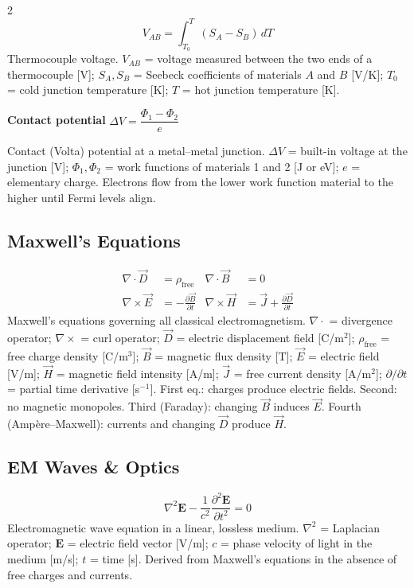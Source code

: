 \documentclass[9pt]{extarticle}
\newcommand{\eqlabel}[1]{\textbf{\scriptsize #1}\;}
\newcommand{\desc}[1]{{\small\color{desc}#1}}
\begin{document}
\begin{multicols}{2}
\[V_{AB} = \int_{T_0}^{T}(S_A - S_B)\,dT\]
\desc{Thermocouple voltage. $V_{AB}$ = voltage measured between the two ends of a thermocouple [V]; $S_A, S_B$ = Seebeck coefficients of materials $A$ and $B$ [V/K]; $T_0$ = cold junction temperature [K]; $T$ = hot junction temperature [K].}

\eqlabel{Contact potential} $\Delta V = \dfrac{\Phi_1 - \Phi_2}{e}$

\desc{Contact (Volta) potential at a metal--metal junction. $\Delta V$ = built-in voltage at the junction [V]; $\Phi_1, \Phi_2$ = work functions of materials 1 and 2 [J or eV]; $e$ = elementary charge. Electrons flow from the lower work function material to the higher until Fermi levels align.}

\subsection{Maxwell's Equations}
\begin{align*}
\nabla\cdot\vec{D} &= \rho_{\text{free}} & \nabla\cdot\vec{B} &= 0 \\
\nabla\times\vec{E} &= -\frac{\partial\vec{B}}{\partial t} & \nabla\times\vec{H} &= \vec{J} + \frac{\partial\vec{D}}{\partial t}
\end{align*}
\desc{Maxwell's equations governing all classical electromagnetism. $\nabla\cdot$ = divergence operator; $\nabla\times$ = curl operator; $\vec{D}$ = electric displacement field [C/m$^2$]; $\rho_{\text{free}}$ = free charge density [C/m$^3$]; $\vec{B}$ = magnetic flux density [T]; $\vec{E}$ = electric field [V/m]; $\vec{H}$ = magnetic field intensity [A/m]; $\vec{J}$ = free current density [A/m$^2$]; $\partial/\partial t$ = partial time derivative [s$^{-1}$]. First eq.: charges produce electric fields. Second: no magnetic monopoles. Third (Faraday): changing $\vec{B}$ induces $\vec{E}$. Fourth (Amp\`ere--Maxwell): currents and changing $\vec{D}$ produce $\vec{H}$.}

\subsection{EM Waves \& Optics}
\[\nabla^2\mathbf{E} - \frac{1}{c^2}\frac{\partial^2\mathbf{E}}{\partial t^2} = 0\]
\desc{Electromagnetic wave equation in a linear, lossless medium. $\nabla^2$ = Laplacian operator; $\mathbf{E}$ = electric field vector [V/m]; $c$ = phase velocity of light in the medium [m/s]; $t$ = time [s]. Derived from Maxwell's equations in the absence of free charges and currents.}


\end{multicols}
\end{document}
